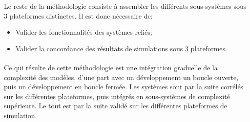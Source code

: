 Le reste de la méthodologie consiste à assembler les différents sous-systèmes sous 3 plateformes distinctes. Il est donc nécessaire de:
\begin{itemize}
\item Valider les fonctionnalités des systèmes reliés;
\item Valider la concordance des résultats de simulations sous 3 plateformes.
\end{itemize}

\paragraph{}Ce qui résulte de cette méthodologie est une intégration graduelle de la complexité des modèles, d'une part avec un développement un boucle ouverte, puis un développement en boucle fermée. Les systèmes sont par la suite corrélés sur les différentes plateformes, puis intégrés en sous-systèmes de complexité supérieure. Le tout est par la suite validé sur les différentes plateformes de simulation.